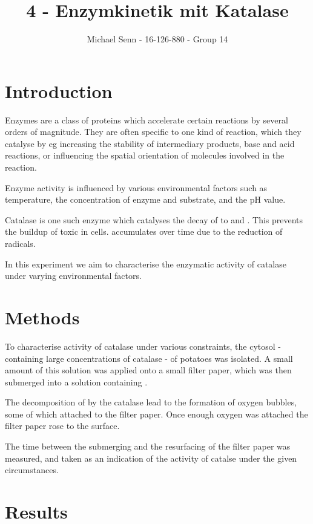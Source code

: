 \documentclass[a4paper,english]{scrreprt}
\title{4 - Enzymkinetik mit Katalase}
\author{Michael Senn \maillink{michael.senn@students.unibe.ch} - 16-126-880 - Group 14}
\date{\printdate}
\begin{document}
\maketitle

\chapter{Introduction}

Enzymes are a class of proteins which accelerate certain reactions by several
orders of magnitude. They are often specific to one kind of reaction, which
they catalyse by eg increasing the stability of intermediary products, base and
acid reactions, or influencing the spatial orientation of molecules involved
in the reaction.

Enzyme activity is influenced by various environmental factors such as
temperature, the concentration of enzyme and substrate, and the pH value.

Catalase is one such enzyme which catalyses the decay of  to 
and . This prevents the buildup of toxic  in cells. 
accumulates over time due to the reduction of  radicals.

In this experiment we aim to characterise the enzymatic activity of catalase
under varying environmental factors.

\chapter{Methods}

To characterise activity of catalase under various constraints, the cytosol -
containing large concentrations of catalase - of potatoes was isolated. A small
amount of this solution was applied onto a small filter paper, which was then
submerged into a solution containing .

The decomposition of  by the catalase lead to the formation of oxygen
bubbles, some of which attached to the filter paper. Once enough oxygen was
attached the filter paper rose to the surface.

The time between the submerging and the resurfacing of the filter paper was
measured, and taken as an indication of the activity of catalse under the given
circumstances.

\chapter{Results}
\end{document}
